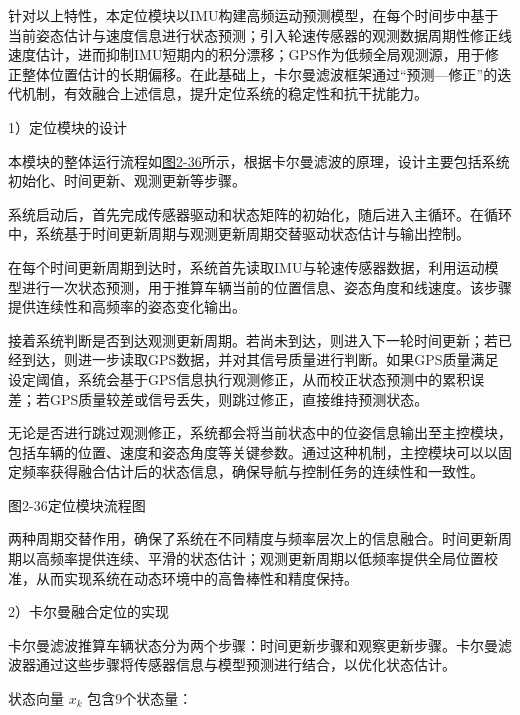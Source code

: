 针对以上特性，本定位模块以IMU构建高频运动预测模型，在每个时间步中基于当前姿态估计与速度信息进行状态预测；引入轮速传感器的观测数据周期性修正线速度估计，进而抑制IMU短期内的积分漂移；GPS作为低频全局观测源，用于修正整体位置估计的长期偏移。在此基础上，卡尔曼滤波框架通过``预测---修正''的迭代机制，有效融合上述信息，提升定位系统的稳定性和抗干扰能力。

1）定位模块的设计

本模块的整体运行流程如\hyperref[_Ref201344278]{图2-36}所示，根据卡尔曼滤波的原理，设计主要包括系统初始化、时间更新、观测更新等步骤。

系统启动后，首先完成传感器驱动和状态矩阵的初始化，随后进入主循环。在循环中，系统基于时间更新周期与观测更新周期交替驱动状态估计与输出控制。

在每个时间更新周期到达时，系统首先读取IMU与轮速传感器数据，利用运动模型进行一次状态预测，用于推算车辆当前的位置信息、姿态角度和线速度。该步骤提供连续性和高频率的姿态变化输出。

接着系统判断是否到达观测更新周期。若尚未到达，则进入下一轮时间更新；若已经到达，则进一步读取GPS数据，并对其信号质量进行判断。如果GPS质量满足设定阈值，系统会基于GPS信息执行观测修正，从而校正状态预测中的累积误差；若GPS质量较差或信号丢失，则跳过修正，直接维持预测状态。

无论是否进行跳过观测修正，系统都会将当前状态中的位姿信息输出至主控模块，包括车辆的位置、速度和姿态角度等关键参数。通过这种机制，主控模块可以以固定频率获得融合估计后的状态信息，确保导航与控制任务的连续性和一致性。



\protect{}\label{_Ref201344278}{}图2-36定位模块流程图

两种周期交替作用，确保了系统在不同精度与频率层次上的信息融合。时间更新周期以高频率提供连续、平滑的状态估计；观测更新周期以低频率提供全局位置校准，从而实现系统在动态环境中的高鲁棒性和精度保持。

2）卡尔曼融合定位的实现

卡尔曼滤波推算车辆状态分为两个步骤：时间更新步骤和观察更新步骤。卡尔曼滤波器通过这些步骤将传感器信息与模型预测进行结合，以优化状态估计。

状态向量 \(x_{k}\) 包含9个状态量：

